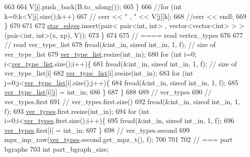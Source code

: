 \begin{DoxyCode}
663 
664         V[j].push\_back(B.to\_ulong());
665       \}
666       \textcolor{comment}{//for (int k=0;k<V[j].size();k++)}
667       \textcolor{comment}{//  cerr << " , " << V[j][k];}
668       \textcolor{comment}{//cerr << endl;}
669     \}
670 
671 
672     \hyperlink{classmarked__graph__compressed_a7df5779d313486644132bd816937f532}{star\_edges}.insert(pair< pair<int, int> , vector<vector<int> > > (pair<int, int>(x, xp), V));
673   \}
674 
675   \textcolor{comment}{// ==== read vertex\_types}
676 
677   \textcolor{comment}{// read ver\_type\_list}
678   fread(&int\_in, \textcolor{keyword}{sizeof} int\_in, 1, f); \textcolor{comment}{// size of ver\_type\_list}
679   \hyperlink{classmarked__graph__compressed_af2e3e55223d436628a02758dfae88493}{ver\_type\_list}.resize(int\_in);
680   \textcolor{keywordflow}{for} (\textcolor{keywordtype}{int} i=0; i<\hyperlink{classmarked__graph__compressed_af2e3e55223d436628a02758dfae88493}{ver\_type\_list}.size();i++)\{
681     fread(&int\_in, \textcolor{keyword}{sizeof} int\_in, 1, f); \textcolor{comment}{// size of ver\_type\_list[i]}
682     \hyperlink{classmarked__graph__compressed_af2e3e55223d436628a02758dfae88493}{ver\_type\_list}[i].resize(int\_in);
683     \textcolor{keywordflow}{for} (\textcolor{keywordtype}{int} j=0;j<\hyperlink{classmarked__graph__compressed_af2e3e55223d436628a02758dfae88493}{ver\_type\_list}[i].size();j++)\{
684       fread(&int\_in, \textcolor{keyword}{sizeof} int\_in, 1, f);
685       \hyperlink{classmarked__graph__compressed_af2e3e55223d436628a02758dfae88493}{ver\_type\_list}[i][j] = int\_in;
686     \}
687   \}
688 
689   \textcolor{comment}{// ver\_types}
690   \textcolor{comment}{// ver\_types.first}
691   \textcolor{comment}{// ver\_types.first.size()}
692   fread(&int\_in, \textcolor{keyword}{sizeof} int\_in, 1, f);
693   \hyperlink{classmarked__graph__compressed_af446cc5e23c241a92b76642fd5ebc403}{ver\_types}.first.resize(int\_in);
694   \textcolor{keywordflow}{for} (\textcolor{keywordtype}{int} i=0;i<\hyperlink{classmarked__graph__compressed_af446cc5e23c241a92b76642fd5ebc403}{ver\_types}.first.size();i++)\{
695     fread(&int\_in, \textcolor{keyword}{sizeof} int\_in, 1, f);
696     \hyperlink{classmarked__graph__compressed_af446cc5e23c241a92b76642fd5ebc403}{ver\_types}.first[i] = int\_in;
697   \}
698   \textcolor{comment}{// ver\_types.second}
699   mpz\_inp\_raw(\hyperlink{classmarked__graph__compressed_af446cc5e23c241a92b76642fd5ebc403}{ver\_types}.second.get\_mpz\_t(), f);
700 
701 
702   \textcolor{comment}{// === part bgraphs}
703   \textcolor{keywordtype}{int} part\_bgraph\_size;

\end{DoxyCode}
